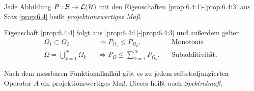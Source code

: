 \begin{defn*}
Jede Abbildung $P: \mathcal{B}\to \mathcal{L}(\mathcal{H})$ mit den Eigenschaften
\ref{prop:6.4:1}-\ref{prop:6.4:3} aus Satz \ref{prop:6.4} heißt
\emph{projektionswertiges Maß}.

Eigenschaft \ref{prop:6.4:4} folgt aus \ref{prop:6.4:1}-\ref{prop:6.4:3} und
außerdem gelten
\begin{align*}
&\Omega_1\subset\Omega_2 &&\Rightarrow
P_{\Omega_1}\le P_{\Omega_2}, && \text{Monotonie}\\
&\Omega = \bigcup_{k=1}^N \Omega_k &&\Rightarrow
P_\Omega \le \sum_{k=1}^N P_{\Omega_k}, &&
\text{Subadditivität}.
\end{align*}

Nach dem messbaren Funktionalkalkül gibt es zu jedem selbstadjungierten Operator
$A$ ein projektionswertiges Maß. Dieses heißt auch
\emph{Spektralmaß}.\fishhere
\end{defn*}
